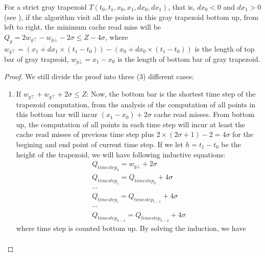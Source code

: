 \begin{lemma}
For a strict gray trapezoid $T(t_0, t_1, x_0, x_1, dx_0, dx_1)$, that is,
$dx_0 < 0$ and $dx_1 > 0$ (see ), if the
algorithm visit all the points in this gray trapezoid bottom up, from
left to right, the minimum cache read miss will be $Q_g =
2 w_{g\top} - w_{g\bot} - 2 \sigma \leq Z - 4 \sigma$, 
where $w_{g\top} = (x_1 + dx_1 \times (t_1 - t_0)) - (x_0 + dx_0 \times (t_1 - t_0))$ 
is the length of top bar of gray trapzoid, $w_{g\bot} = x_1 - x_0$ is the length of bottom
bar of gray trapezoid.
\label{lem:topTrapezoid}
\end{lemma}

\begin{proof}
We still divide the proof into three (3) different cases:
\begin{enumerate}
	\item \label{case:topTrapezoid1}
		  If $w_{g\top} + w_{g\top} + 2 \sigma \leq Z$: Now, the
          bottom bar is the shortest time step of the 
          trapezoid computation, from the analysis of
           the
          computation of all points in this bottom bar will incur $(x_1
          - x_0) + 2 \sigma$ cache read misses. From bottom up, the
          computation of all points in each time step will incur at
          least the cache read misses of previous time step plus 
          $2 \times (2 \sigma + 1) - 2 = 4 \sigma$ 
          for the begining and end point of current time
          step. If we let $h = t_1 - t_0$ be the height of the trapezoid,
          we will have following inductive equations: 
			\begin{equation}
			\begin{array}{l}
				Q_{timestep_0} = w_{g\bot} + 2 \sigma \\
				Q_{timestep_1} = Q_{timestep_0} + 4 \sigma \\
				\cdots \\
				Q_{timestep_i} = Q_{timestep_{i-1}} + 4 \sigma \\
				\cdots \\
				Q_{timestep_{h-1}} = Q_{timestep_{h-2}} + 4 \sigma
			\end{array}
			\label{eq:upTrapezoidCacheInduction}
			\end{equation}
          where time step is counted bottom up. 
          By solving the induction, we have 
          \begin{equation}
          \begin{array}{l}

\end{array}
\end{equation}
\end{enumerate}
\end{proof}
